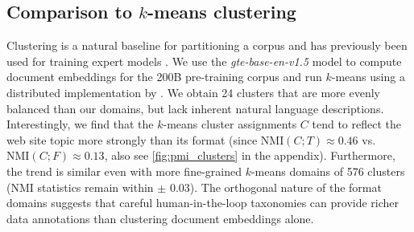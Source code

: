 \subsection{Comparison to \texorpdfstring{$k$}{k}-means clustering} \label{sec:kmeans}
Clustering is a natural baseline for partitioning a corpus and has previously been used for training expert models \citep{gururangan2023scaling}.
We use the {\it gte-base-en-v1.5} model \citep{li2023gte} to compute document embeddings for the 200B pre-training corpus and run $k$-means using a distributed implementation by \citet{vo2024automatic}.
We obtain 24 clusters that are more evenly balanced than our domains, but lack inherent natural language descriptions.
Interestingly, we find that the $k$-means cluster assignments $C$ tend to reflect the web site topic more strongly than its format (since $\text{NMI}(C; T) \approx 0.46$ vs. $\text{NMI}(C; F) \approx 0.13$, also see \autoref{fig:pmi_clusters} in the appendix).
Furthermore, the trend is similar even with more fine-grained $k$-means domains of 576 clusters (NMI statistics remain within $\pm$ 0.03).
The orthogonal nature of the format domains suggests that careful human-in-the-loop taxonomies can provide richer data annotations than clustering document embeddings alone.
